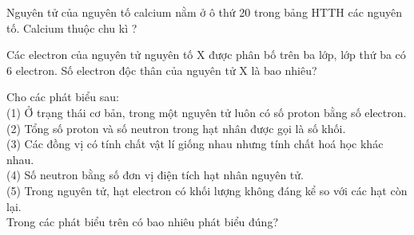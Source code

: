 \documentclass[11pt,a4paper]{article}
\begin{document}
\begin{ex}
Nguyên tử của nguyên tố calcium nằm ở ô thứ 20 trong bảng HTTH các nguyên tố. Calcium thuộc chu kì ?

\end{ex}
\begin{ex}
Các electron của nguyên tử nguyên tố X được phân bố trên ba lớp, lớp thứ ba có 6 electron. Số electron độc thân của nguyên tử X là bao nhiêu?

\end{ex}
\begin{ex}
Cho các phát biểu sau:\\
(1) Ở trạng thái cơ bản, trong một nguyên tử luôn có số proton bằng số electron.\\
(2) Tổng số proton và số neutron trong hạt nhân được gọi là số khối.\\
(3) Các đồng vị có tính chất vật lí giống nhau nhưng tính chất hoá học khác nhau.\\
(4) Số neutron bằng số đơn vị điện tích hạt nhân nguyên tử.\\
(5) Trong nguyên tử, hạt electron có khối lượng không đáng kể so với các hạt còn lại.\\
Trong các phát biểu trên có bao nhiêu phát biểu đúng?

\end{ex}
\end{document}
